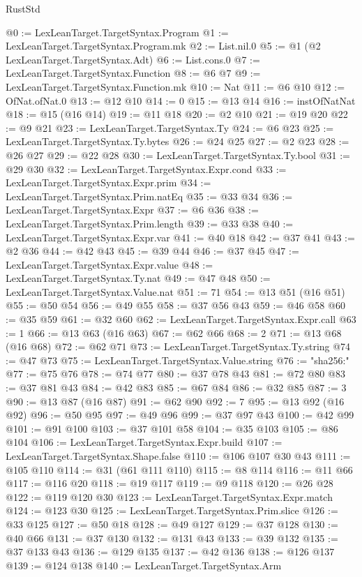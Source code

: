 \begin{lexlean}{RustStd}
\begin{coremodule}
{\begin{coremodule}
{{{{{{{{{{{{@0 := LexLeanTarget.TargetSyntax.Program
@1 := LexLeanTarget.TargetSyntax.Program.mk
@2 := List.nil.{0}
@5 := @1 (@2 LexLeanTarget.TargetSyntax.Adt)
@6 := List.cons.{0}
@7 := LexLeanTarget.TargetSyntax.Function
@8 := @6 @7
@9 := LexLeanTarget.TargetSyntax.Function.mk
@10 := Nat
@11 := @6 @10
@12 := OfNat.ofNat.{0}
@13 := @12 @10
@14 := 0
@15 := @13 @14
@16 := instOfNatNat
@18 := @15 (@16 @14)
@19 := @11 @18
@20 := @2 @10
@21 := @19 @20
@22 := @9 @21
@23 := LexLeanTarget.TargetSyntax.Ty
@24 := @6 @23
@25 := LexLeanTarget.TargetSyntax.Ty.bytes
@26 := @24 @25
@27 := @2 @23
@28 := @26 @27
@29 := @22 @28
@30 := LexLeanTarget.TargetSyntax.Ty.bool
@31 := @29 @30
@32 := LexLeanTarget.TargetSyntax.Expr.cond
@33 := LexLeanTarget.TargetSyntax.Expr.prim
@34 := LexLeanTarget.TargetSyntax.Prim.natEq
@35 := @33 @34
@36 := LexLeanTarget.TargetSyntax.Expr
@37 := @6 @36
@38 := LexLeanTarget.TargetSyntax.Prim.length
@39 := @33 @38
@40 := LexLeanTarget.TargetSyntax.Expr.var
@41 := @40 @18
@42 := @37 @41
@43 := @2 @36
@44 := @42 @43
@45 := @39 @44
@46 := @37 @45
@47 := LexLeanTarget.TargetSyntax.Expr.value
@48 := LexLeanTarget.TargetSyntax.Ty.nat
@49 := @47 @48
@50 := LexLeanTarget.TargetSyntax.Value.nat
@51 := 71
@54 := @13 @51 (@16 @51)
@55 := @50 @54
@56 := @49 @55
@58 := @37 @56 @43
@59 := @46 @58
@60 := @35 @59
@61 := @32 @60
@62 := LexLeanTarget.TargetSyntax.Expr.call
@63 := 1
@66 := @13 @63 (@16 @63)
@67 := @62 @66
@68 := 2
@71 := @13 @68 (@16 @68)
@72 := @62 @71
@73 := LexLeanTarget.TargetSyntax.Ty.string
@74 := @47 @73
@75 := LexLeanTarget.TargetSyntax.Value.string
@76 := "sha256:"
@77 := @75 @76
@78 := @74 @77
@80 := @37 @78 @43
@81 := @72 @80
@83 := @37 @81 @43
@84 := @42 @83
@85 := @67 @84
@86 := @32 @85
@87 := 3
@90 := @13 @87 (@16 @87)
@91 := @62 @90
@92 := 7
@95 := @13 @92 (@16 @92)
@96 := @50 @95
@97 := @49 @96
@99 := @37 @97 @43
@100 := @42 @99
@101 := @91 @100
@103 := @37 @101 @58
@104 := @35 @103
@105 := @86 @104
@106 := LexLeanTarget.TargetSyntax.Expr.build
@107 := LexLeanTarget.TargetSyntax.Shape.false
@110 := @106 @107 @30 @43
@111 := @105 @110
@114 := @31 (@61 @111 @110)
@115 := @8 @114
@116 := @11 @66
@117 := @116 @20
@118 := @19 @117
@119 := @9 @118
@120 := @26 @28
@122 := @119 @120 @30
@123 := LexLeanTarget.TargetSyntax.Expr.match
@124 := @123 @30
@125 := LexLeanTarget.TargetSyntax.Prim.slice
@126 := @33 @125
@127 := @50 @18
@128 := @49 @127
@129 := @37 @128
@130 := @40 @66
@131 := @37 @130
@132 := @131 @43
@133 := @39 @132
@135 := @37 @133 @43
@136 := @129 @135
@137 := @42 @136
@138 := @126 @137
@139 := @124 @138
@140 := LexLeanTarget.TargetSyntax.Arm
}}}}}}}}}}}}
\end{coremodule}}
\end{coremodule}
\end{lexlean}
